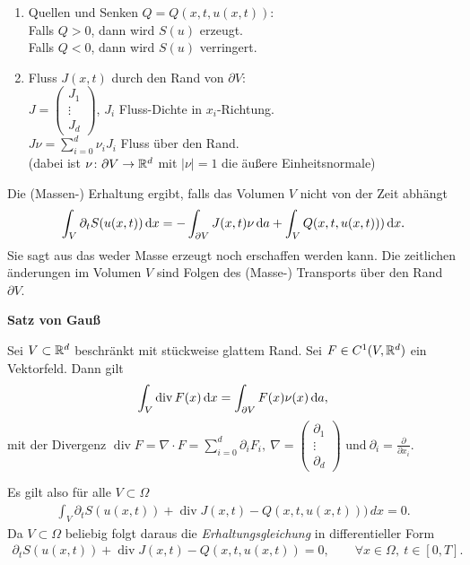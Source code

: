 \begin{enumerate}[1)]
  \item
      Quellen und Senken $Q = Q(x, t, u(x,t))$: \\
      Falls $Q > 0$, dann wird $S(u)$ erzeugt. \\
      Falls $Q < 0$, dann wird $S(u)$ verringert.
  \item
      Fluss $J(x,t)$ durch den Rand von $\partial V$: \\
      $J = \left(\begin{smallmatrix}
              J_1 \\ \vdots \\ J_d
	      \end{smallmatrix}\right)$,
      $J_i$ Fluss-Dichte in $x_i$-Richtung. \\
      $J\nu = \sum_{i=0}^d \nu_i J_i$ Fluss über den Rand. \\
      (dabei ist $\nu\colon \partial V \to \mathbb{R}^d$ mit $|\nu| = 1$ die
      äu\ss{}ere Einheitsnormale)
\end{enumerate}


Die (Massen-) Erhaltung ergibt, falls das Volumen $V$ nicht von der Zeit
abhängt
\begin{eqnarray*}
      \int_V \partial_t S(u(x,t)) \,\mathrm{d}x
    = - \int_{\partial V} J(x,t) \nu \,\mathrm{d}a + \int_V Q(x,t,u(x,t))) \,\mathrm{d}x.
\end{eqnarray*}
Sie sagt aus das weder Masse erzeugt noch erschaffen werden kann. Die
zeitlichen änderungen im Volumen $V$ sind Folgen des (Masse-) Transports
über den Rand $\partial V$.


\textbf{Satz von Gau\ss}

  Sei $V\subset\mathbb{R}^d$ beschränkt mit stückweise glattem Rand. Sei $F\in
  C^1(V,\mathbb{R}^d)$ ein Vektorfeld. Dann gilt
  \begin{eqnarray*}
      \int_V \operatorname{div} F(x) \,\mathrm{d}x = \int_{\partial V} F(x) \nu(x) \,\mathrm{d}a,
  \end{eqnarray*}
  mit der Divergenz $\operatorname{div} F = \nabla \cdot F = \sum_{i=0}^d
  \partial_i F_i, \
  \nabla = \left(\begin{smallmatrix}
                \partial_1 \\ \vdots \\ \partial_d
           \end{smallmatrix}\right) \text{ und}
  \ \partial_i = \frac{\partial}{\partial x_i}$.


\begin{Anwendung}
    Es gilt also für alle $V\subset \Omega$
    \begin{eqnarray*}
        \int_V \partial_tS(u(x,t)) + \operatorname{div} J(x,t)
        - Q(x,t,u(x,t)))\,dx = 0.
    \end{eqnarray*}
    Da $V\subset\Omega$ beliebig folgt daraus die
    \emph{Erhaltungsgleichung} in differentieller Form
    \begin{eqnarray*}
        \partial_tS(u(x,t)) + \operatorname{div} J(x,t) - Q(x,t,u(x,t)) = 0,
        \qquad \forall x\in \Omega, \ t\in [0,T].
    \end{eqnarray*}
\end{Anwendung}


